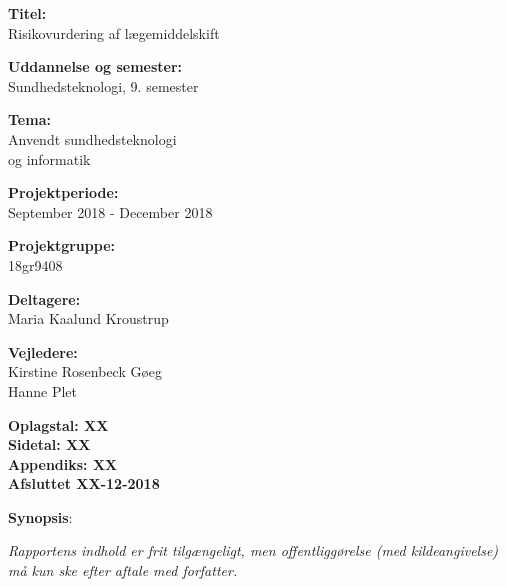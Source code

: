 \begin{minipage}[t]{0.48\textwidth}
\textbf{Titel:} \\[5pt]\bigskip\hspace{2ex}
Risikovurdering af lægemiddelskift

\textbf{Uddannelse og semester:} \\[5pt]\bigskip\hspace{2ex}
Sundhedsteknologi, 9. semester

\textbf{Tema:} \\[5pt]\bigskip\hspace{2ex}
Anvendt sundhedsteknologi \\ \bigskip\hspace{2ex}
og informatik

\vspace*{2mm}

\textbf{Projektperiode:} \\[5pt]\bigskip\hspace{2ex}
September 2018 - December 2018

\textbf{Projektgruppe:} \\[5pt]\bigskip\hspace{2ex}
18gr9408

\textbf{Deltagere:} \\[5pt]\hspace*{2ex}
Maria Kaalund Kroustrup

\vspace*{5mm}

\textbf{Vejledere:} \\[5pt]\hspace*{2ex}
Kirstine Rosenbeck Gøeg \\\bigskip\hspace{2ex}
Hanne Plet

\vspace*{1cm}

\textbf{Oplagstal: XX} \\
\textbf{Sidetal: XX} \\
\textbf{Appendiks: XX} \\ 
\textbf{Afsluttet XX-12-2018}

\end{minipage}
\hfill
\begin{minipage}[t]{0.483\textwidth}
\textbf{Synopsis}: \\[5pt]
\fbox{\parbox{7cm}{\bigskip\bigskip}}
\end{minipage}

\vfill

{\footnotesize\itshape Rapportens indhold er frit tilgængeligt, men offentliggørelse (med kildeangivelse) må kun ske efter aftale med forfatter.}

